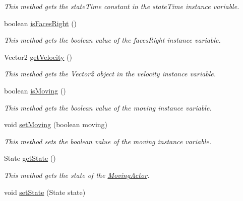 \begin{DoxyCompactItemize}
\begin{DoxyCompactList}\small\item\em This method gets the state\+Time constant in the state\+Time instance variable. \end{DoxyCompactList}\item 
boolean \hyperlink{classnl_1_1arjanfrans_1_1mario_1_1model_1_1MovingActor_a4fb6d4e3924b419bf9fb360cf2598672}{is\+Faces\+Right} ()
\begin{DoxyCompactList}\small\item\em This method gets the boolean value of the faces\+Right instance variable. \end{DoxyCompactList}\item 
Vector2 \hyperlink{classnl_1_1arjanfrans_1_1mario_1_1model_1_1MovingActor_a0ab43947ad415abb6be30ede3695b712}{get\+Velocity} ()
\begin{DoxyCompactList}\small\item\em This method gets the Vector2 object in the velocity instance variable. \end{DoxyCompactList}\item 
boolean \hyperlink{classnl_1_1arjanfrans_1_1mario_1_1model_1_1MovingActor_a43e403fe46a10dbac42c1f7800146a9c}{is\+Moving} ()
\begin{DoxyCompactList}\small\item\em This method gets the boolean value of the moving instance variable. \end{DoxyCompactList}\item 
void \hyperlink{classnl_1_1arjanfrans_1_1mario_1_1model_1_1MovingActor_af9e155f3ced19b73b253ce8f2d8f044d}{set\+Moving} (boolean moving)
\begin{DoxyCompactList}\small\item\em This method sets the boolean value of the moving instance variable. \end{DoxyCompactList}\item 
State \hyperlink{classnl_1_1arjanfrans_1_1mario_1_1model_1_1MovingActor_a40606a6b3bdc2afe43cfba764b00af4c}{get\+State} ()
\begin{DoxyCompactList}\small\item\em This method gets the state of the \hyperlink{classnl_1_1arjanfrans_1_1mario_1_1model_1_1MovingActor}{Moving\+Actor}. \end{DoxyCompactList}\item 
void \hyperlink{classnl_1_1arjanfrans_1_1mario_1_1model_1_1MovingActor_a64188e7edb074bbf9e193a8ec5fa2ec2}{set\+State} (State state)

\end{DoxyCompactItemize}

